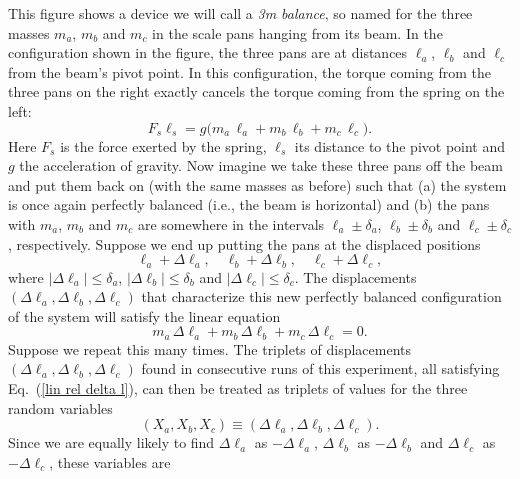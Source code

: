 This figure shows a device we will call a \emph{3m balance}, so named for the three masses $m_a$, $m_b$ and $m_c$ in the scale pans hanging from its beam. In the configuration shown in the figure, the three pans are at distances $\ell_a$, $\ell_b$ and $\ell_c$ from the beam's pivot point. In this configuration, the torque coming from the three pans on the right exactly cancels the torque coming from the spring on the left:   
\begin{equation}
F_s \ell_s = g \big( m_a \, \ell_a + m_b \, \ell_b + m_c \, \ell_c \big).
\label{torques}
\end{equation}
Here $F_s$ is the force exerted by the spring, $\ell_s$ its distance to the pivot point and $g$ the acceleration of gravity. Now imagine we take these three pans off the beam and put them back on (with the same masses as before) such that (a) the system is once again perfectly balanced (i.e., the beam is horizontal) and (b) the pans with $m_a$, $m_b$ and $m_c$ are somewhere in the intervals  $\ell_a \pm \delta_a$, $\ell_b \pm \delta_b$ and $\ell_c \pm \delta_c$, respectively. Suppose we end up putting the pans at the displaced positions
\begin{equation}
\ell_a + \Delta \ell_a, \quad \ell_b + \Delta \ell_b, \quad \ell_c + \Delta \ell_c,
\end{equation}
where $| \Delta \ell_a | \le \delta_a$, $| \Delta \ell_b | \le \delta_b$ and $| \Delta \ell_c | \le \delta_c$. The displacements $(\Delta \ell_a, \Delta \ell_b, \Delta \ell_c)$ that characterize this new perfectly balanced configuration of the system will satisfy the linear equation
\begin{equation}
m_a \, \Delta \ell_a + m_b \, \Delta\ell_b + m_c \, \Delta \ell_c  = 0.
\label{lin rel delta l}
\end{equation}
Suppose we repeat this many times.
The triplets of displacements $(\Delta \ell_a, \Delta \ell_b, \Delta \ell_c)$ found in consecutive runs of this experiment, all satisfying Eq.\ (\ref{lin rel delta l}), can then be treated as triplets of values for the three random variables
\begin{equation}
(X_a, X_b, X_c) \equiv (\Delta \ell_a, \Delta \ell_b, \Delta \ell_c).
\label{X = delta l}
\end{equation}
Since we are equally likely to find $\Delta \ell_a$ as $-\Delta \ell_a$, $\Delta \ell_b$ as $-\Delta \ell_b$ and $\Delta \ell_c$ as $-\Delta \ell_c$, these variables are 
